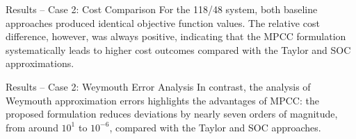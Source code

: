 \documentclass[hyperref={colorlinks,citecolor=blue,linkcolor=blue,urlcolor=blue}]{beamer}
\newlength\figureheight
\newlength\figurewidth
\begin{document}
\begin{frame}{Results – Case 2: Cost Comparison}
\footnotesize
\justifying
For the 118/48 system, both baseline approaches produced identical objective 
function values. The relative cost difference, however, was always positive, 
indicating that the MPCC formulation systematically leads to higher cost 
outcomes compared with the Taylor and SOC approximations. 

\vspace{0.5em}
\begin{figure}[!htb]
    \centering
    \setlength{}        
    \setlength{}
    
    \label{fig:green_test_cost}
\end{figure}
\end{frame}




\begin{frame}{Results – Case 2: Weymouth Error Analysis}
\footnotesize
\justifying
In contrast, the analysis of Weymouth approximation errors highlights the 
advantages of MPCC: the proposed formulation reduces deviations by nearly 
seven orders of magnitude, from around $10^1$ to $10^{-6}$, compared with 
the Taylor and SOC approaches.

\vspace{0.5em}
\begin{figure}[!htb]
    \centering
    \setlength{}        
    \setlength{}
    \subfloat[Taylor]{}
    \subfloat[SOC]{}
    \subfloat[MPCC]{}
    \label{fig:green_test_error}
\end{figure}
\end{frame}
\end{document}
